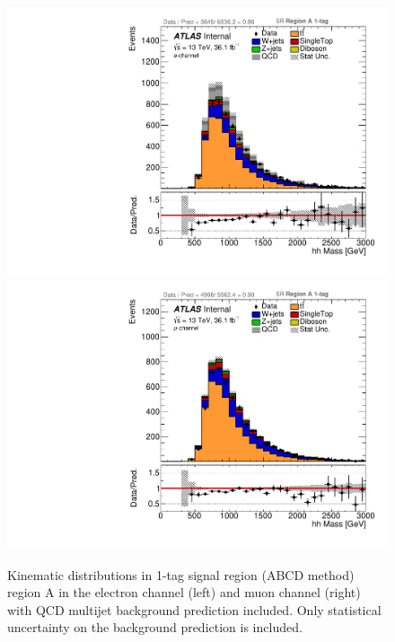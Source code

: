 \begin{figure}[!htbp]
\begin{center}
\includegraphics[scale=0.33]{./figures/boosted/ABCD_1tag0bjet/elec_SR_RegionA_hhMass_withDD} 
\includegraphics[scale=0.33]{./figures/boosted/ABCD_1tag0bjet/muon_SR_RegionA_hhMass_withDD}    
\caption{Kinematic distributions in 1-tag signal region (ABCD method) region A in the electron channel (left) and muon channel (right) with QCD multijet
background prediction included. Only statistical uncertainty on the background prediction is included.}
\label{fig:boosted_abcd_1tag0bjet_region_a_withqcd_SR}
\end{center}
\end{figure}

